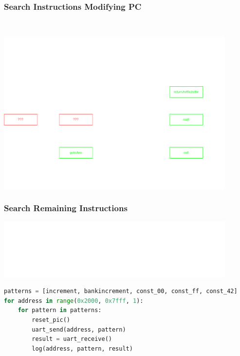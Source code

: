 \documentclass[aspectratio=169]{beamer}
\begin{document}
\begin{frame}
	\frametitle{Search Instructions Modifying PC}

	~\\

	\begin{center}
		\includegraphics[width=0.9\textwidth]{flowchart-stack-search.pdf}
	\end{center}
\end{frame}

\begin{frame}[fragile]
	\frametitle{Search Remaining Instructions}

	\begin{center}
		\includegraphics[width=0.9\textwidth]{flowchart-sram-search.pdf}
	\end{center}

\begin{scriptsize}
\begin{lstlisting}[frame=single,language=Python,commentstyle=\color{commentsColor}\textit,keywordstyle=\color{keywordsColor}\bfseries,stringstyle=\color{stringColor}]
patterns = [increment, bankincrement, const_00, const_ff, const_42]
for address in range(0x2000, 0x7fff, 1):
    for pattern in patterns:
        reset_pic()
        uart_send(address, pattern)
        result = uart_receive()
        log(address, pattern, result)
\end{lstlisting}
\end{scriptsize}
\end{frame}
\end{document}
